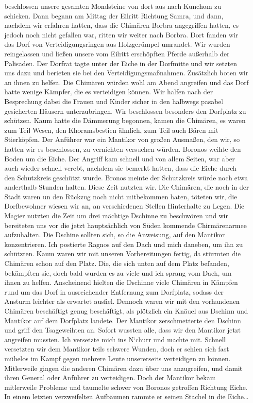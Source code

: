 beschlossen unsere gesamten Mondsteine von dort aus nach Kunchom zu schicken. Dann begann am Mittag der Eilritt Richtung Samra, und dann, nachdem wir erfahren hatten, dass die Chimären Borbra angegriffen hatten, es jedoch noch nicht gefallen war, ritten wir weiter nach Borbra. Dort fanden wir das Dorf von Verteidigungsringen aus Holzgerümpel umrandet. Wir wurden reingelassen und ließen unsere vom Eilritt erschöpften Pferde außerhalb der Palisaden. Der Dorfrat tagte unter der Eiche in der Dorfmitte und wir setzten uns dazu und berieten sie bei den Verteidigungsmaßnahmen. Zusätzlich boten wir an ihnen zu helfen. Die Chimären würden wohl am Abend angreifen und das Dorf hatte wenige Kämpfer, die es verteidigen können. Wir halfen nach der Besprechung dabei die Frauen und Kinder sicher in den halbwegs pasabel gesicherten Häusern unterzubringen. Wir beschlossen besonders den Dorfplatz zu schützen. Kaum hatte die Dämmerung begonnen, kamen die Chimären, es waren zum Teil Wesen, den Khoramsbestien ähnlich, zum Teil auch Bären mit Stierköpfen. Der Anführer war ein Mantikor von großen Ausmaßen, den wir, so hatten wir es beschlossen, zu vernichten versuchen würden. Boronos weihte den Boden um die Eiche. Der Angriff kam schnell und von allem Seiten, war aber auch wieder schnell verebt, nachdem sie bemerkt hatten, dass die Eiche durch den Schutzkreis geschützt wurde. Bronos meinte der Schutzkreis würde noch etwa anderthalb Stunden halten. Diese Zeit nutzten wir. Die Chimären, die noch in der Stadt waren un den Rückzug noch nicht mitbekommen haten, töteten wir, die Dorfbewohner wiesen wir an, an verschiedenen Stellen Hinterhalte zu Legen. Die Magier nutzten die Zeit um drei mächtige Dschinne zu beschwören und wir bereiteten uns vor die jetzt hauptsächlich von Süden kommende Chirmärenarmee aufzuhalten. Die Dschine sollten sich, so die Anweisung, auf den Mantikor konzentrieren. Ich postierte Ragnos auf den Dach und mich daneben, um ihn zu schützten. Kaum waren wir mit unseren Vorbereitungen fertig, da stürmten die Chimären schon auf den Platz. Die, die sich unten auf dem Platz befanden, bekämpften sie, doch bald wurden es zu viele und ich sprang vom Dach, um ihnen zu helfen. Anscheinend hielten die Dschinne viele Chimären in Kämpfen rund um das Dorf in ausreichender Entfernung zum Dorfplatz, sodass der Ansturm leichter als erwartet ausfiel. Dennoch waren wir mit den vorhandenen Chimären beschäftigt genug beschäftigt, als plötzlich ein Knäuel aus Dschinn und Mantikor auf dem Dorfplatz landete. Der Mantikor zerschmetterte den Dschinn und griff den Tsageweihten an. Sofort wussten alle, dass wir den Mantikor jetzt angreifen mussten. Ich versetzte mich ins N`churr und machte mit. Schnell versetzten wir dem Mantikor teils schwere Wunden, doch er schien sich fast mühelos im Kampf gegen mehrere Leute unsererseits verteidigen zu können. Mitlerweile gingen die anderen Chimären dazu über uns anzugreifen, und damit ihren General oder Anführer zu verteidigen. Doch der Mantikor bekam mitlerweile Probleme und taumelte schwer von Boronos getroffen Richtung Eiche. In einem letzten verzweifelten Aufbäumen rammte er seinen Stachel in die Eiche\dots

